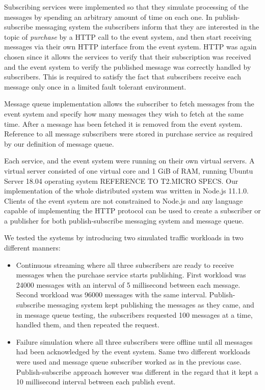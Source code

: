 \documentclass[conference]{IEEEtran}
\begin{document}
Subscribing services were implemented so that they simulate processing of the messages by spending an arbitrary amount of time on each one. In publish-subscribe messaging system the subscribers inform that they are interested in the topic of \textit{purchase} by a HTTP call to the event system, and then start receiving messages via their own HTTP interface from the event system. HTTP was again chosen since it allows the services to verify that their subscription was received and the event system to verify the published message was correctly handled by subscribers. This is required to satisfy the fact that subscribers receive each message only once in a limited fault tolerant environment.

Message queue implementation allows the subscriber to fetch messages from the event system and specify how many messages they wish to fetch at the same time. After a message has been fetched it is removed from the event system. Reference to all message subscribers were stored in purchase service as required by our definition of message queue.

Each service, and the event system were running on their own virtual servers. A virtual server consisted of one virtual core and 1 GiB of RAM, running Ubuntu Server 18.04 operating system REFERENCE TO T2.MICRO SPECS. Our implementation of the whole distributed system was written in Node.js 11.1.0. Clients of the event system are not constrained to Node.js and any language capable of implementing the HTTP protocol can be used to create a subscriber or a publisher for both publish-subscribe messaging system and message queue.

We tested the systems by introducing two simulated traffic workloads in two different manners:
\begin{itemize}
    \item Continuous streaming where all three subscribers are ready to receive messages when the purchase service starts publishing. First workload was 24000 messages with an interval of 5 millisecond between each message. Second workload was 96000 messages with the same interval. Publish-subscribe messaging system kept publishing the messages as they came, and in message queue testing, the subscribers requested 100 messages at a time, handled them, and then repeated the request.
    \item Failure simulation where all three subscribers were offline until all messages had been acknowledged by the event system. Same two different workloads were used and message queue subscriber worked as in the previous case. Publish-subscribe approach however was different in the regard that it kept a 10 millisecond interval between each publish event.
\end{itemize}
\end{document}

